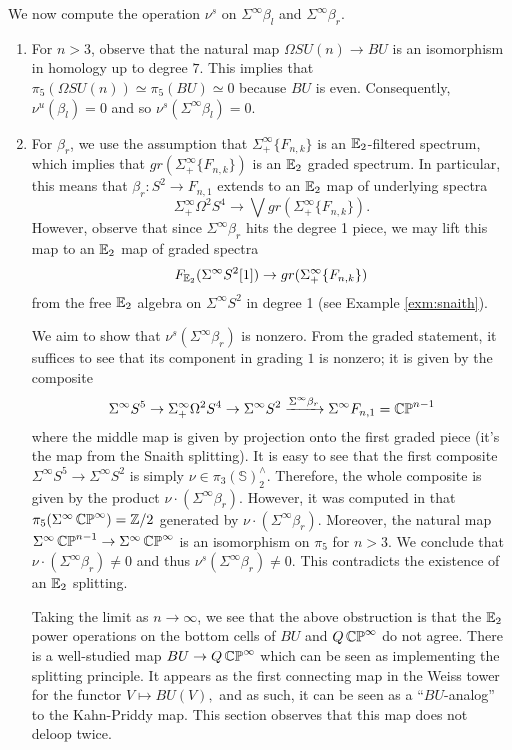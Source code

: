 We now compute the operation $\nu^s$ on $\Sigma^{\infty} \beta_l$ and $\Sigma^{\infty} \beta_r$.  
\begin{enumerate}
\item For $n>3$, observe that the natural map $\Omega SU(n) \to BU$ is an isomorphism in homology up to degree $7$.  This implies that $\pi_5(\Omega SU(n)) \simeq \pi_5(BU) \simeq 0$ because $BU$ is even.  Consequently, $\nu^u(\beta_l) = 0$ and so $\nu^s(\Sigma^{\infty} \beta_l) = 0.$  

\item For $\beta_r$, we use the assumption that $\Sigma^{\infty}_+ \{ F_{n,k} \}$ is an $\operatorname{\mathbb{E}}_2$-filtered spectrum, which implies that $gr(\Sigma^{\infty}_+ \{ F_{n,k} \})$ is an $\operatorname{\mathbb{E}}_2$ graded spectrum.  In particular, this means that $\beta_r: S^2 \to F_{n,1}$ extends to an $\operatorname{\mathbb{E}}_2$ map of underlying spectra $$\Sigma^{\infty}_+ \Omega^2 S^4 \to \bigvee gr(\Sigma^{\infty}_+ \{ F_{n,k} \}).$$  However, observe that since $\Sigma^{\infty} \beta_r$ hits the degree 1 piece, we may lift this map to an $\operatorname{\mathbb{E}}_2$ map of graded spectra $$F_{\operatorname{\mathbb{E}}_2}(\Sigma^\infty S^2[1]) \to gr(\Sigma^{\infty}_+ \{ F_{n,k} \})$$ from the free $\operatorname{\mathbb{E}}_2$ algebra on $\Sigma^{\infty} S^2$ in degree 1 (see Example \ref{exm:snaith}).  

We aim to show that $\nu^s(\Sigma^\infty \beta_r)$ is nonzero.  From the graded statement, it suffices to see that its component in grading $1$ is nonzero; it is given by the composite $$\Sigma^{\infty} S^5 \to \Sigma^{\infty}_+ \Omega^2 S^4 \to \Sigma^{\infty} S^2 \xrightarrow{\Sigma^{\infty} \beta_r} \Sigma^{\infty} F_{n,1} = \operatorname{\mathbb{CP}}^{n-1}$$ where the middle map is given by projection onto the first graded piece (it's the map from the Snaith splitting).  It is easy to see that the first composite $\Sigma^{\infty} S^5 \to \Sigma^{\infty} S^2$ is simply $\nu \in \pi_3(\mathbb{S})^{\wedge}_2.$  Therefore, the whole composite is given by the product $\nu\cdot (\Sigma^{\infty} \beta_r).$  
However, it was computed in \cite[Theorem II.8]{Liulevicius} that $\pi_5(\Sigma^{\infty}\operatorname{\mathbb{CP}}^{\infty})=\mathbb{Z}/2$ generated by $\nu \cdot (\Sigma^{\infty}\beta_r).$  Moreover, the natural map $\Sigma^{\infty}\operatorname{\mathbb{CP}}^{n-1} \to \Sigma^{\infty}\operatorname{\mathbb{CP}}^\infty$ is an isomorphism on $\pi_5$ for $n>3$.  We conclude that $\nu \cdot (\Sigma^{\infty}\beta_r )\neq 0$ and thus $\nu^s(\Sigma^{\infty} \beta_r) \neq 0$.  This contradicts the existence of an $\operatorname{\mathbb{E}}_2$ splitting.  

\begin{rmk}
Taking the limit as $n\to\infty$, we see that the above obstruction is that the $\operatorname{\mathbb{E}}_2$ power operations on the bottom cells of $BU$ and $Q\operatorname{\mathbb{CP}}^{\infty}$ do not agree.  There is a well-studied map $BU \to Q\operatorname{\mathbb{CP}}^{\infty}$ which can be seen as implementing the splitting principle.  It appears as the first connecting map in the Weiss tower for the functor $V \mapsto BU(V),$ and as such, it can be seen as a ``$BU$-analog'' to the Kahn-Priddy map.  This section observes that this map does not deloop twice.
\end{rmk}



\end{enumerate}

